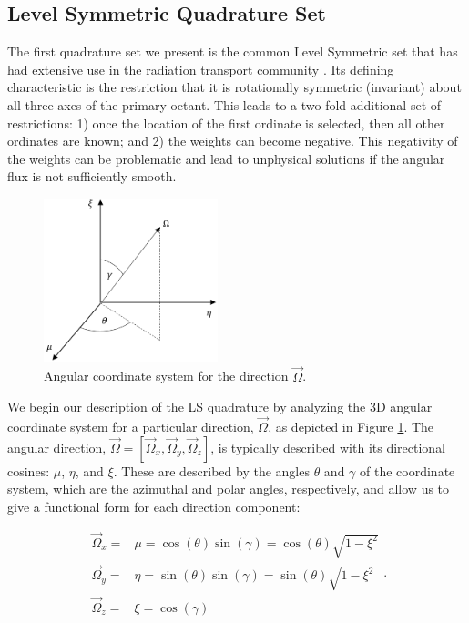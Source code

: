 \subsection{Level Symmetric Quadrature Set}
\label{sec::Sn_Angle_LS}

The first quadrature set we present is the common Level Symmetric set that has had extensive use in the radiation transport community \cite{lewis1984computational,carlson1968computing}. Its defining characteristic is the restriction that it is rotationally symmetric (invariant) about all three axes of the primary octant. This leads to a two-fold additional set of restrictions: 1) once the location of the first ordinate is selected, then all other ordinates are known; and 2) the weights can become negative. This negativity of the weights can be problematic and lead to unphysical solutions if the angular flux is not sufficiently smooth.

\begin{figure}
\centering
\includegraphics[width=0.45\textwidth]{figures/sec_Sn/Ang_Quad_Coord_Sys.png}
\caption{Angular coordinate system for the direction $\vec{\Omega}$.}
\label{fig::Ang_Coord_Sys}
\end{figure}

We begin our description of the LS quadrature by analyzing the 3D angular coordinate system for a particular direction, $\vec{\Omega}$, as depicted in Figure \ref{fig::Ang_Coord_Sys}. The angular direction, $\vec{\Omega} = [\vec{\Omega}_x, \vec{\Omega}_y, \vec{\Omega}_z]$, is typically described with its directional cosines: $\mu$, $\eta$, and $\xi$. These are described by the angles $\theta$ and $\gamma$ of the coordinate system, which are the azimuthal and polar angles, respectively, and allow us to give a functional form for each direction component:

\begin{equation}
\label{eq::Sn_Angle_angle_components}
\begin{aligned}
\vec{\Omega}_x =& \mu = \cos (\theta) \sin (\gamma)  =\cos (\theta)  \sqrt{1 - \xi^2}  \\
\vec{\Omega}_y =& \eta = \sin (\theta) \sin (\gamma)  =\sin (\theta)   \sqrt{1 - \xi^2}   \\
\vec{\Omega}_z =& \xi = \cos (\gamma)
\end{aligned} .
\end{equation}

